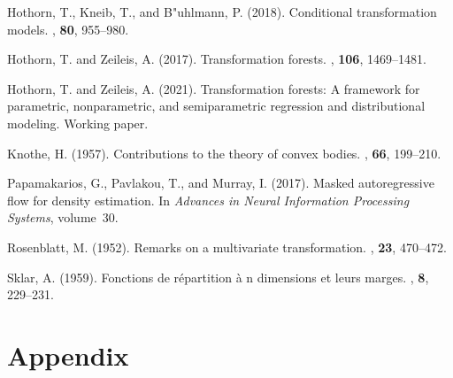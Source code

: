 \documentclass[11pt,a4paper,twoside]{book}\usepackage[]{graphicx}\usepackage[]{xcolor}
\begin{document}
\begin{thebibliography}{}

Hothorn, T., Kneib, T., and B{"u}hlmann, P. (2018).
\newblock Conditional transformation models.
, {\bf80},  955--980.

Hothorn, T. and Zeileis, A. (2017).
\newblock Transformation forests.
, {\bf106},  1469--1481.

Hothorn, T. and Zeileis, A. (2021).
\newblock Transformation forests: A framework for parametric, nonparametric,
  and semiparametric regression and distributional modeling.
\newblock Working paper.

Knothe, H. (1957).
\newblock Contributions to the theory of convex bodies.
, {\bf66},  199--210.

Papamakarios, G., Pavlakou, T., and Murray, I. (2017).
\newblock Masked autoregressive flow for density estimation.
\newblock In {\em Advances in Neural Information Processing Systems},
  volume~30.

Rosenblatt, M. (1952).
\newblock Remarks on a multivariate transformation.
, {\bf23},  470--472.

Sklar, A. (1959).
\newblock Fonctions de r{\'e}partition {\`a} n dimensions et leurs marges.
, {\bf8},  229--231.

\end{thebibliography}


\appendix




\chapter{Appendix}\label{ch:appendix}
\end{document}
